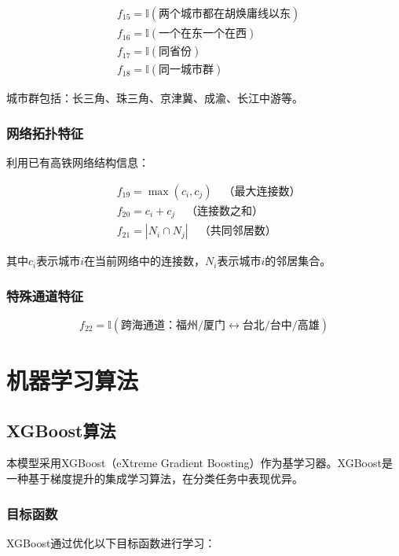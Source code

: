 \documentclass[12pt,a4paper]{article}
\begin{document}
\begin{align}
& f_{15} = \mathbb{I}(\text{两个城市都在胡焕庸线以东}) \\
& f_{16} = \mathbb{I}(\text{一个在东一个在西}) \\
& f_{17} = \mathbb{I}(\text{同省份}) \\
& f_{18} = \mathbb{I}(\text{同一城市群})
\end{align}

城市群包括：长三角、珠三角、京津冀、成渝、长江中游等。

\subsubsection{网络拓扑特征}
利用已有高铁网络结构信息：

\begin{align}
& f_{19} = \max(c_i, c_j) \quad \text{（最大连接数）} \\
& f_{20} = c_i + c_j \quad \text{（连接数之和）} \\
& f_{21} = |N_i \cap N_j| \quad \text{（共同邻居数）}
\end{align}

其中$c_i$表示城市$i$在当前网络中的连接数，$N_i$表示城市$i$的邻居集合。

\subsubsection{特殊通道特征}
\begin{equation}
f_{22} = \mathbb{I}(\text{跨海通道：福州/厦门} \leftrightarrow \text{台北/台中/高雄})
\end{equation}

\section{机器学习算法}

\subsection{XGBoost算法}

本模型采用XGBoost（eXtreme Gradient Boosting）作为基学习器。XGBoost是一种基于梯度提升的集成学习算法，在分类任务中表现优异。

\subsubsection{目标函数}
XGBoost通过优化以下目标函数进行学习：
\end{document}
